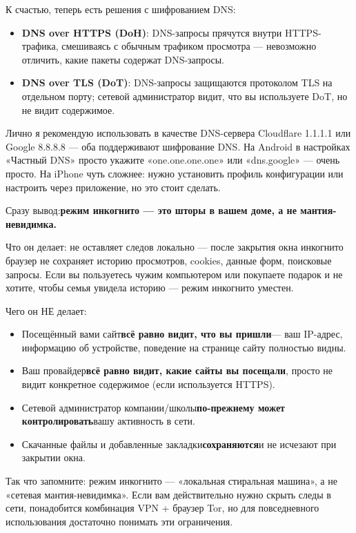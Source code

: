 К счастью, теперь есть решения с шифрованием DNS:

\begin{itemize}
  \item \textbf{DNS over HTTPS (DoH)}: DNS-запросы прячутся внутри HTTPS-трафика, смешиваясь с обычным трафиком просмотра — невозможно отличить, какие пакеты содержат DNS-запросы.
  \item \textbf{DNS over TLS (DoT)}: DNS-запросы защищаются протоколом TLS на отдельном порту; сетевой администратор видит, что вы используете DoT, но не видит содержимое.
\end{itemize}

Лично я рекомендую использовать в качестве DNS-сервера Cloudflare 1.1.1.1 или Google 8.8.8.8 — оба поддерживают шифрование DNS. На Android в настройках «Частный DNS» просто укажите «one.one.one.one» или «dns.google» — очень просто. На iPhone чуть сложнее: нужно установить профиль конфигурации или настроить через приложение, но это стоит сделать.


Сразу вывод:\textbf{режим инкогнито — это шторы в вашем доме, а не мантия-невидимка.}

Что он делает: не оставляет следов локально — после закрытия окна инкогнито браузер не сохраняет историю просмотров, cookies, данные форм, поисковые запросы. Если вы пользуетесь чужим компьютером или покупаете подарок и не хотите, чтобы семья увидела историю — режим инкогнито уместен.

Чего он НЕ делает:

\begin{itemize}
  \item Посещённый вами сайт\textbf{всё равно видит, что вы пришли}— ваш IP-адрес, информацию об устройстве, поведение на странице сайту полностью видны.
  \item Ваш провайдер\textbf{всё равно видит, какие сайты вы посещали}, просто не видит конкретное содержимое (если используется HTTPS).
  \item Сетевой администратор компании/школы\textbf{по-прежнему может контролировать}вашу активность в сети.
  \item Скачанные файлы и добавленные закладки\textbf{сохраняются}и не исчезают при закрытии окна.
\end{itemize}

Так что запомните: режим инкогнито — «локальная стиральная машина», а не «сетевая мантия-невидимка». Если вам действительно нужно скрыть следы в сети, понадобится комбинация VPN + браузер Tor, но для повседневного использования достаточно понимать эти ограничения.

